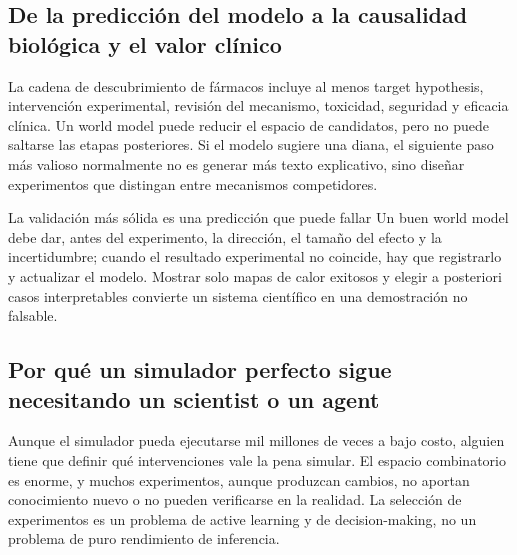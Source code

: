 \subsection{De la predicción del modelo a la causalidad biológica y el valor clínico}

La cadena de descubrimiento de fármacos incluye al menos target hypothesis, intervención experimental, revisión del mecanismo, toxicidad, seguridad y eficacia clínica. Un world model puede reducir el espacio de candidatos, pero no puede saltarse las etapas posteriores. Si el modelo sugiere una diana, el siguiente paso más valioso normalmente no es generar más texto explicativo, sino diseñar experimentos que distingan entre mecanismos competidores.


\begin{importantbox}{La validación más sólida es una predicción que puede fallar}
Un buen world model debe dar, antes del experimento, la dirección, el tamaño del efecto y la incertidumbre; cuando el resultado experimental no coincide, hay que registrarlo y actualizar el modelo. Mostrar solo mapas de calor exitosos y elegir a posteriori casos interpretables convierte un sistema científico en una demostración no falsable.
\end{importantbox}

\subsection{Por qué un simulador perfecto sigue necesitando un scientist o un agent}

Aunque el simulador pueda ejecutarse mil millones de veces a bajo costo, alguien tiene que definir qué intervenciones vale la pena simular. El espacio combinatorio es enorme, y muchos experimentos, aunque produzcan cambios, no aportan conocimiento nuevo o no pueden verificarse en la realidad. La selección de experimentos es un problema de active learning y de decision-making, no un problema de puro rendimiento de inferencia.


